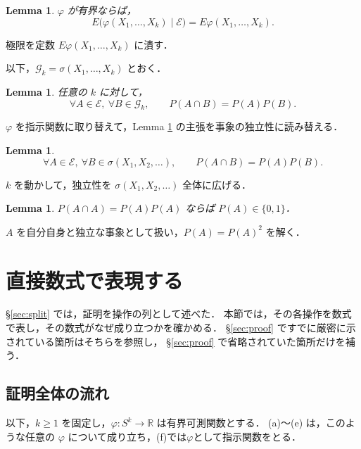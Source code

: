 \documentclass[a4paper,11pt,uplatex,dvipdfmx]{jsarticle}
\theoremstyle{plain}
\newtheorem{lemma}[theorem]{Lemma}
\theoremstyle{definition}
\begin{document}
\begin{lemma}\label{lem:constant}
$\varphi$ が有界ならば，
\[
  E\bigl(\varphi(X_1,\dots,X_k)\mid\mathcal{E}\bigr)=E\varphi(X_1,\dots,X_k).
\]
\end{lemma}

極限を定数 $E\varphi(X_1,\dots,X_k)$ に潰す．

以下，$\mathcal{G}_k=\sigma(X_1,\dots,X_k)$ とおく．

\begin{lemma}\label{lem:independent-k}
任意の $k$ に対して，
\[
  \forall A\in\mathcal{E},\ \forall B\in\mathcal{G}_k,\qquad P(A\cap B)=P(A)P(B).
\]
\end{lemma}

$\varphi$ を指示関数に取り替えて，Lemma \ref{lem:constant} の主張を事象の独立性に読み替える．

\begin{lemma}\label{lem:independent-all}
\[
  \forall A\in\mathcal{E},\ \forall B\in\sigma(X_1,X_2,\dots),\qquad P(A\cap B)=P(A)P(B).
\]
\end{lemma}

$k$ を動かして，独立性を $\sigma(X_1,X_2,\dots)$ 全体に広げる．

\begin{lemma}\label{lem:self}
$P(A\cap A)=P(A)P(A)$ ならば $P(A)\in\{0,1\}$．
\end{lemma}

$A$ を自分自身と独立な事象として扱い，$P(A)=P(A)^2$ を解く．

\section{直接数式で表現する}\label{sec:directly}

\S\ref{sec:split} では，証明を操作の列として述べた．
本節では，その各操作を数式で表し，その数式がなぜ成り立つかを確かめる．
\S\ref{sec:proof} ですでに厳密に示されている箇所はそちらを参照し，
\S\ref{sec:proof} で省略されていた箇所だけを補う．

\subsection{証明全体の流れ}\label{subsec:directly-flow}

以下，$k\ge1$ を固定し，$\varphi:S^k\to\mathbb{R}$ は有界可測関数とする．
(a)〜(e) は，このような任意の $\varphi$ について成り立ち，(f)では$\varphi$として指示関数をとる．
\end{document}
